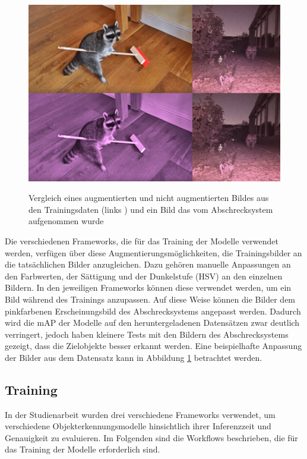 \begin{figure}[H]
    \centering
    \includegraphics[width=\textwidth]{images/combine_augment.png}
    \label{fig:vgl_img_data_real}
    \caption{Vergleich eines augmentierten und nicht augmentierten Bildes aus den Trainingsdaten (links \cite{wasch_detect}) und ein Bild das vom Abschrecksystem aufgenommen wurde}
\end{figure}

Die verschiedenen Frameworks, die für das Training der Modelle verwendet werden, verfügen über diese Augmentierungsmöglichkeiten, die Trainingsbilder an die tatsächlichen Bilder anzugleichen. Dazu gehören manuelle Anpassungen an den Farbwerten, der Sättigung und der Dunkelstufe (HSV) an den einzelnen Bildern. In den jeweiligen Frameworks können diese verwendet werden, um ein Bild während des Trainings anzupassen. Auf diese Weise können die Bilder dem pinkfarbenen Erscheinungsbild des Abschrecksystems angepasst werden. Dadurch wird die \ac{mAP} der Modelle auf den heruntergeladenen Datensätzen zwar deutlich verringert, jedoch haben kleinere Tests mit den Bildern des Abschrecksystems gezeigt, dass die Zielobjekte besser erkannt werden. Eine beispielhafte Anpassung der Bilder aus dem Datensatz kann in Abbildung \ref{fig:vgl_img_data_real} betrachtet werden.


\subsection{Training}

In der Studienarbeit wurden drei verschiedene Frameworks verwendet, um verschiedene Objekterkennungsmodelle hinsichtlich ihrer Inferenzzeit und Genauigkeit zu evaluieren. Im Folgenden sind die Workflows beschrieben, die für das Training der Modelle erforderlich sind.

